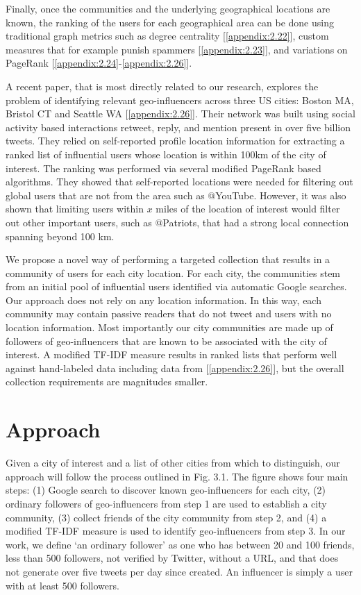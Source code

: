 Finally, once the communities and the underlying geographical locations are known, the ranking of the users for each geographical area can be done using traditional graph metrics such as degree centrality [\ref{appendix:2.22}], custom measures that for example punish spammers [\ref{appendix:2.23}], and variations on PageRank [\ref{appendix:2.24}-\ref{appendix:2.26}]. 

A recent paper, that is most directly related to our research, explores the problem of identifying relevant geo-influencers across three US cities: Boston MA, Bristol CT and Seattle WA [\ref{appendix:2.26}]. Their network was built using social activity based interactions retweet, reply, and mention present in over five billion tweets. They relied on self-reported profile location information for extracting a ranked list of influential users whose location is within 100km of the city of interest. The ranking was performed via several modified PageRank based algorithms. They showed that self-reported locations were needed for filtering out global users that are not from the area such as @YouTube. However, it was also shown that limiting users within $x$ miles of the location of interest would filter out other important users, such as @Patriots, that had a strong local connection spanning beyond 100 km.

We propose a novel way of performing a targeted collection that results in a community of users for each city location. For each city, the communities stem from an initial pool of influential users identified via automatic Google searches. Our approach does not rely on any location information. In this way, each community may contain passive readers that do not tweet and users with no location information. Most importantly our city communities are made up of followers of geo-influencers that are known to be associated with the city of interest. A modified TF-IDF measure results in ranked lists that perform well against hand-labeled data including data from [\ref{appendix:2.26}], but the overall collection requirements are magnitudes smaller.

\section{Approach}
Given a city of interest and a list of other cities from which to distinguish, our approach will follow the process outlined in Fig. 3.1. The figure shows four main steps: (1) Google search to discover known geo-influencers for each city, (2) ordinary followers of geo-influencers from step 1 are used to establish a city community, (3) collect friends of the city community from step 2, and (4) a modified TF-IDF measure is used to identify geo-influencers from step 3. In our work, we define `an ordinary follower' as one who has between 20 and 100 friends, less than 500 followers, not verified by Twitter, without a URL, and that does not generate over five tweets per day since created. An influencer is simply a user with at least 500 followers.

